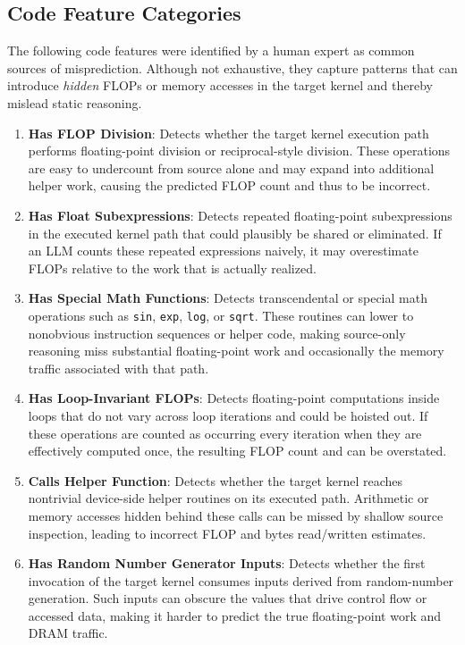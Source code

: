 

\newpage
\appendix

\subsection{Code Feature Categories}
\label{sec:codeFeatureCategoriesAppendix}
The following code features were identified by a human expert as common sources of \rai misprediction.
Although not exhaustive, they capture patterns that can introduce \textit{hidden} FLOPs or memory accesses in the target kernel and thereby mislead static reasoning.
\begin{enumerate}
    \item \textbf{Has FLOP Division}: Detects whether the target kernel execution path performs floating-point division or reciprocal-style division. These operations are easy to undercount from source alone and may expand into additional helper work, causing the predicted FLOP count and thus \rai to be incorrect.
    \item \textbf{Has Float Subexpressions}: Detects repeated floating-point subexpressions in the executed kernel path that could plausibly be shared or eliminated. If an LLM counts these repeated expressions naively, it may overestimate FLOPs relative to the work that is actually realized.
    \item \textbf{Has Special Math Functions}: Detects transcendental or special math operations such as \texttt{sin}, \texttt{exp}, \texttt{log}, or \texttt{sqrt}. These routines can lower to nonobvious instruction sequences or helper code, making source-only reasoning miss substantial floating-point work and occasionally the memory traffic associated with that path.
    \item \textbf{Has Loop-Invariant FLOPs}: Detects floating-point computations inside loops that do not vary across loop iterations and could be hoisted out. If these operations are counted as occurring every iteration when they are effectively computed once, the resulting FLOP count and \rai can be overstated.
    \item \textbf{Calls Helper Function}: Detects whether the target kernel reaches nontrivial device-side helper routines on its executed path. Arithmetic or memory accesses hidden behind these calls can be missed by shallow source inspection, leading to incorrect FLOP and bytes read/written estimates.
    \item \textbf{Has Random Number Generator Inputs}: Detects whether the first invocation of the target kernel consumes inputs derived from random-number generation. Such inputs can obscure the values that drive control flow or accessed data, making it harder to predict the true floating-point work and DRAM traffic.

\end{enumerate}
